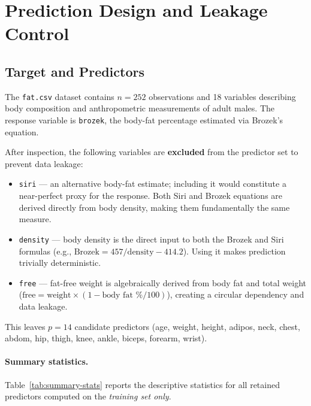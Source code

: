 \section{Prediction Design and Leakage Control}
\label{sec:prediction-design}

\subsection{Target and Predictors}
\label{sec:target-predictors}

The \texttt{fat.csv} dataset contains $n = 252$ observations and 18 variables
describing body composition and anthropometric measurements of adult males.
The response variable is \texttt{brozek}, the body-fat percentage estimated via
Brozek's equation.

After inspection, the following variables are \textbf{excluded} from the
predictor set to prevent data leakage:
%
\begin{itemize}
    \item \texttt{siri} — an alternative body-fat estimate; including it would
          constitute a near-perfect proxy for the response. Both Siri and Brozek equations are derived directly from body density, making them fundamentally the same measure.
    \item \texttt{density} — body density is the direct input to both the Brozek
          and Siri formulas (e.g., $\text{Brozek} = 457 / \text{density} - 414.2$). Using it makes prediction trivially deterministic.
    \item \texttt{free} — fat-free weight is algebraically derived from body fat
          and total weight ($\text{free} = \text{weight} \times (1 - \text{body fat \%} / 100)$), creating a circular dependency and data leakage.
\end{itemize}

This leaves $p = 14$ candidate predictors (age, weight, height, adipos, neck,
chest, abdom, hip, thigh, knee, ankle, biceps, forearm, wrist).

\paragraph{Summary statistics.}
Table~\ref{tab:summary-stats} reports the descriptive statistics for all
retained predictors computed on the \emph{training set only}.

